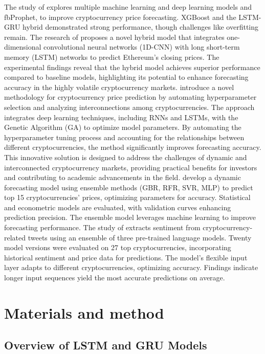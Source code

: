 \documentclass{dsfe}
\begin{document}
The study of \citep{amberkhani2025} explores multiple machine learning and deep learning models and fbProphet, to improve cryptocurrency price forecasting. XGBoost and the LSTM-GRU hybrid demonstrated strong performance, though challenges like overfitting remain.  The research of \citep{hoa2025} proposes a novel hybrid model that integrates one-dimensional convolutional neural networks (1D-CNN) with long short-term memory (LSTM) networks to predict Ethereum's closing prices. The experimental findings reveal that the hybrid model achieves superior performance compared to baseline models, highlighting its potential to enhance forecasting accuracy in the highly volatile cryptocurrency markets. \citep{hadfi2025}  introduce a novel methodology for cryptocurrency price prediction by automating hyperparameter selection and analyzing interconnections among cryptocurrencies. The approach integrates deep learning techniques, including RNNs and LSTMs, with the Genetic Algorithm (GA) to optimize model parameters. By automating the hyperparameter tuning process and accounting for the relationships between different cryptocurrencies, the method significantly improves forecasting accuracy. This innovative solution is designed to address the challenges of dynamic and interconnected cryptocurrency markets, providing practical benefits for investors and contributing to academic advancements in the field. \citep{kiranmai2025} develop a dynamic forecasting model using ensemble methods (GBR, RFR, SVR, MLP) to predict top 15 cryptocurrencies' prices, optimizing parameters for accuracy. Statistical and econometric models are evaluated, with validation curves enhancing prediction precision. The ensemble model leverages machine learning to improve forecasting performance.  The study of \citep{amirshahi2025}  extracts sentiment from cryptocurrency-related tweets using an ensemble of three pre-trained language models. Twenty model versions were evaluated on 27 top cryptocurrencies, incorporating historical sentiment and price data for predictions. The model's flexible input layer adapts to different cryptocurrencies, optimizing accuracy. Findings indicate longer input sequences yield the most accurate predictions on average.
\section{Materials and method}
\subsection{Overview of LSTM and GRU Models}
\end{document}
